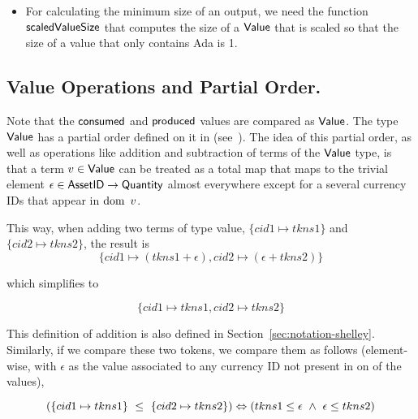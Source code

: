 \begin{itemize}
  \item For calculating the minimum size of an output, we need the
  function $\mathsf{scaledValueSize}$ that computes the size of a $\mathsf{Value}$
  that is scaled so that the size of a value that only contains Ada is
  1.
\end{itemize}

\subsection{Value Operations and Partial Order.}
\label{sec:value-ops}
Note that
the $\mathsf{consumed}$ and $\mathsf{produced}$ values are compared as $\mathsf{Value}$.
The type $\mathsf{Value}$ has a partial order defined on it in (see~\cite{plutus_eutxo}).
The idea of this partial order, as well as operations like addition and subtraction
of terms of the $\mathsf{Value}$ type, is that a term $v \in \mathsf{Value}$ can be treated
as a total map that maps to the trivial element $\epsilon \in \mathsf{AssetID} \to \mathsf{Quantity}$
almost everywhere except for a several currency IDs that appear in $\operatorname{dom}~v$.

This way, when adding two terms of type value, $\{ cid1 \mapsto tkns1\}$ and
$\{ cid2 \mapsto tkns2\}$, the result is
\[ \{ cid1 \mapsto (tkns1 + \epsilon), cid2 \mapsto (\epsilon + tkns2)\} \]

which simplifies to

\[ \{ cid1 \mapsto tkns1, cid2 \mapsto tkns2\} \]

This definition of addition is also defined in Section~\ref{sec:notation-shelley}.
Similarly, if we compare these two tokens, we compare them as follows
(element-wise, with $\epsilon$ as the value associated to any currency ID
not present in on of the values),

\[ (\{ cid1 \mapsto tkns1\}~\leq~\{ cid2 \mapsto tkns2\}) \Leftrightarrow \\
   (tkns1 \leq \epsilon~\wedge~ \epsilon \leq tkns2) \]

